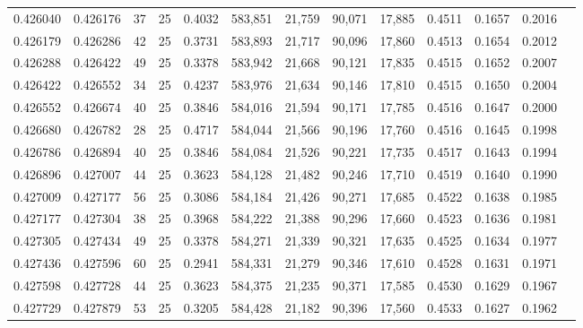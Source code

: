 \begin{tabular}{rrrrrrrrrrrrr}
0.426040 & 0.426176 &    37 &  25 &                                     0.4032 & 583,851 &  21,759 &  90,071 &  17,885 & 0.4511 & 0.1657 & 0.2016 \\
0.426179 & 0.426286 &    42 &  25 &                                     0.3731 & 583,893 &  21,717 &  90,096 &  17,860 & 0.4513 & 0.1654 & 0.2012 \\
0.426288 & 0.426422 &    49 &  25 &                                     0.3378 & 583,942 &  21,668 &  90,121 &  17,835 & 0.4515 & 0.1652 & 0.2007 \\
0.426422 & 0.426552 &    34 &  25 &                                     0.4237 & 583,976 &  21,634 &  90,146 &  17,810 & 0.4515 & 0.1650 & 0.2004 \\
0.426552 & 0.426674 &    40 &  25 &                                     0.3846 & 584,016 &  21,594 &  90,171 &  17,785 & 0.4516 & 0.1647 & 0.2000 \\
0.426680 & 0.426782 &    28 &  25 &                                     0.4717 & 584,044 &  21,566 &  90,196 &  17,760 & 0.4516 & 0.1645 & 0.1998 \\
0.426786 & 0.426894 &    40 &  25 &                                     0.3846 & 584,084 &  21,526 &  90,221 &  17,735 & 0.4517 & 0.1643 & 0.1994 \\
0.426896 & 0.427007 &    44 &  25 &                                     0.3623 & 584,128 &  21,482 &  90,246 &  17,710 & 0.4519 & 0.1640 & 0.1990 \\
0.427009 & 0.427177 &    56 &  25 &                                     0.3086 & 584,184 &  21,426 &  90,271 &  17,685 & 0.4522 & 0.1638 & 0.1985 \\
0.427177 & 0.427304 &    38 &  25 &                                     0.3968 & 584,222 &  21,388 &  90,296 &  17,660 & 0.4523 & 0.1636 & 0.1981 \\
0.427305 & 0.427434 &    49 &  25 &                                     0.3378 & 584,271 &  21,339 &  90,321 &  17,635 & 0.4525 & 0.1634 & 0.1977 \\
0.427436 & 0.427596 &    60 &  25 &                                     0.2941 & 584,331 &  21,279 &  90,346 &  17,610 & 0.4528 & 0.1631 & 0.1971 \\
0.427598 & 0.427728 &    44 &  25 &                                     0.3623 & 584,375 &  21,235 &  90,371 &  17,585 & 0.4530 & 0.1629 & 0.1967 \\
0.427729 & 0.427879 &    53 &  25 &                                     0.3205 & 584,428 &  21,182 &  90,396 &  17,560 & 0.4533 & 0.1627 & 0.1962 \\

\end{tabular}
